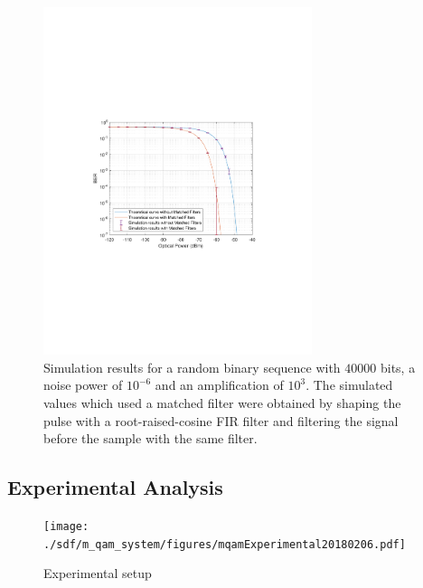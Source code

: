 \begin{figure}[H]
	\centering
	\includegraphics[clip, trim=4cm 8cm 4cm 8cm, width=0.7\textwidth]{./sdf/m_qam_system/figures/teor_vs_simul.pdf}
	\caption{Simulation results for a random binary sequence with $40000$ bits, a noise power of $10^{-6}$ and an amplification of $10^3$. The simulated values which used a matched filter were obtained by shaping the pulse with a root-raised-cosine FIR filter and filtering the signal before the sample with the same filter.}
	\label{fig:ber_pseudorandom}
\end{figure}%

\subsection*{Experimental Analysis}
\begin{figure}[H]
	\centering
	\texttt{[image: ./sdf/m\_qam\_system/figures/mqamExperimental20180206.pdf]}
	\caption{Experimental setup}
	\label{fig:experimental_mqam_setup}
\end{figure}
%
%
\begin{table}[H]
	\centering
	\begin{tabulary}{1.0\textwidth}{|L|L|l|}
	\end{tabulary}
\end{table}


